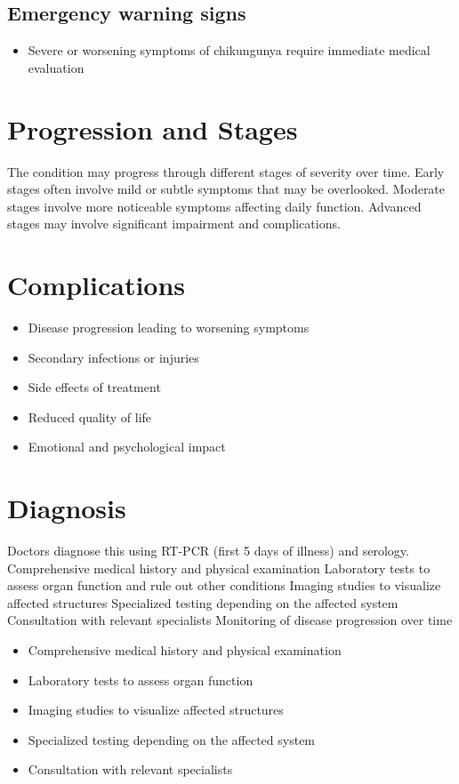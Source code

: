 \subsection{Emergency warning signs}
\begin{itemize}[noitemsep]
  \item Severe or worsening symptoms of chikungunya require immediate medical evaluation
\end{itemize}
\section{Progression and Stages}
The condition may progress through different stages of severity over time. Early stages often involve mild or subtle symptoms that may be overlooked. Moderate stages involve more noticeable symptoms affecting daily function. Advanced stages may involve significant impairment and complications.
\section{Complications}
\begin{itemize}[noitemsep]
  \item Disease progression leading to worsening symptoms
  \item Secondary infections or injuries
  \item Side effects of treatment
  \item Reduced quality of life
  \item Emotional and psychological impact
\end{itemize}
\section{Diagnosis}
Doctors diagnose this using RT-PCR (first 5 days of illness) and serology. Comprehensive medical history and physical examination Laboratory tests to assess organ function and rule out other conditions Imaging studies to visualize affected structures Specialized testing depending on the affected system Consultation with relevant specialists Monitoring of disease progression over time

\begin{itemize}[noitemsep]
  \item Comprehensive medical history and physical examination
  \item Laboratory tests to assess organ function
  \item Imaging studies to visualize affected structures
  \item Specialized testing depending on the affected system
  \item Consultation with relevant specialists
\end{itemize}
